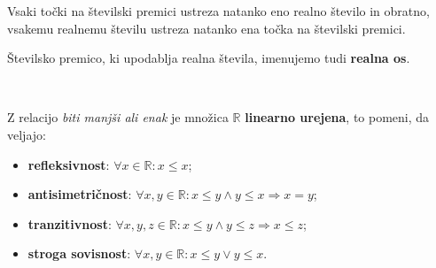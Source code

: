\begin{figure}[H]
                    
                \end{figure}
            

            
            
                Vsaki točki na številski premici ustreza natanko eno realno število in obratno, 
                vsakemu realnemu številu ustreza natanko ena točka na številski premici.
            

            
                Številsko premico, ki upodablja realna števila, imenujemo tudi \textbf{realna os}.
            


        
                ~~        
            
                Z relacijo \textit{biti manjši ali enak} je množica $\mathbb{R}$ \textbf{linearno urejena}, 
                to pomeni, da veljajo:

                \begin{itemize}
                    \item \textbf{refleksivnost}: $\forall x\in\mathbb{R}: x\leq x$;
                    \item \textbf{antisimetričnost}: $\forall x,y\in\mathbb{R}: x\leq y \land y\leq x \Rightarrow x=y$;
                    \item \textbf{tranzitivnost}: $\forall x,y,z\in\mathbb{R}: x\leq y \land y\leq z \Rightarrow x\leq z$;
                    \item \textbf{stroga sovisnost}: $\forall x,y\in\mathbb{R}: x\leq y \lor y\leq x$.
                \end{itemize}
            


